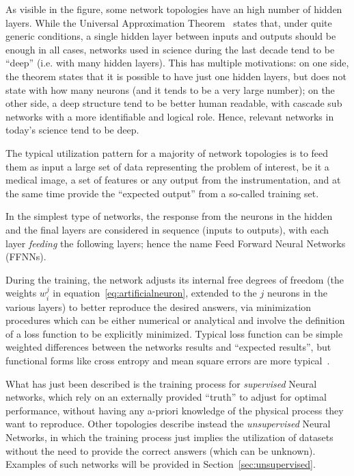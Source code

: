 As visible in the figure, some network topologies have an high number of hidden layers. While the Universal Approximation Theorem~\cite{nonlinearitytheorem} states that, under quite generic conditions, a single hidden layer between inputs and outputs should be enough in all cases, networks used in science during the last decade tend to be ``deep'' (i.e. with many hidden layers). This has multiple motivations: on one side, the theorem states that it is possible to have just one hidden layers, but does not state with how many neurons (and it tends to be a very large number); on the other side, a deep structure tend to be better human readable, with cascade sub networks with a more identifiable and logical role. Hence, relevant networks in today's science tend to be deep.


The typical utilization pattern for a majority of network topologies is to feed them as input a large set of data representing the problem of interest, be it a medical image, a set of features or any output from the instrumentation, and at the same time provide the ``expected output''
from a so-called training set. 

In the simplest type of networks, the response from the neurons in the hidden and the final layers are considered in sequence (inputs to outputs), with each layer \emph{feeding} the following layers; hence the name Feed Forward Neural Networks (FFNNs).

During the training, the network adjusts its internal free degrees of freedom (the weights $w_i^j$ in equation~\ref{eq:artificialneuron}, extended to the $j$ neurons in the various layers) to better reproduce the desired answers, via minimization procedures which can be either numerical or analytical and involve the definition of a loss function to be explicitly minimized. Typical loss function can be simple weighted differences between the networks results and ``expected results'', but functional forms like cross entropy and mean square errors are more typical~\cite{lossfunctions}.

What has just been described is the training process for \emph{supervised} Neural networks, which rely on an externally provided ``truth'' to adjust for optimal performance, without having any a-priori knowledge of the physical process they want to reproduce.
Other topologies describe instead the \emph{unsupervised} Neural Networks, in which the training process just implies the utilization of datasets without the need to provide the correct answers (which can be unknown). Examples of such networks will be provided in Section~\ref{sec:unsupervised}.

